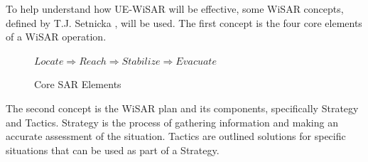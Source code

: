 To help understand how UE-WiSAR will be effective, some WiSAR
concepts, defined by T.J. Setnicka \cite[p.~35]{setnicka1980}, will be used. 
The first concept is the four core elements of a WiSAR operation.
\begin{figure}[h]
	\begin{center}
		\begin{math}
			Locate \Rightarrow Reach \Rightarrow Stabilize \Rightarrow Evacuate
		\end{math}
	\end{center}
	\caption{Core SAR Elements}
\end{figure}

The second concept is the WiSAR plan and its components, specifically Strategy
and Tactics.  Strategy is the process of gathering information and making an
accurate assessment of the situation.  Tactics are outlined solutions for
specific situations that can be used as part of a Strategy.



